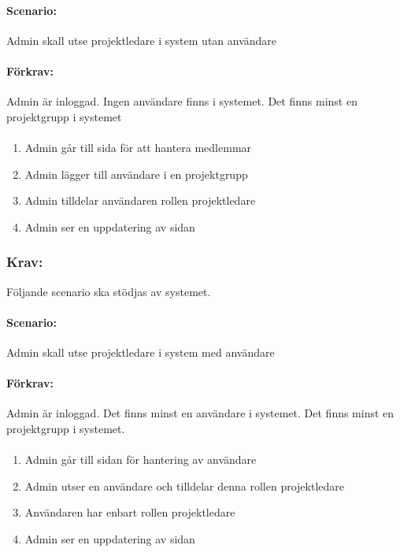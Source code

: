 \documentclass[paper=a4, fontsize=11pt,twoside]{article}
\begin{document}
\paragraph{Scenario:}
Admin skall utse projektledare i system utan användare
\paragraph{Förkrav:}
Admin är inloggad. Ingen användare finns i systemet. Det finns minst en projektgrupp i systemet
\paragraph{}
\begin{enumerate}
\item Admin går till sida för att hantera medlemmar
\item Admin lägger till användare i en projektgrupp
\item Admin tilldelar användaren rollen projektledare
\item Admin ser en uppdatering av sidan
\end{enumerate}

\subsubsection*{Krav:} Följande scenario ska stödjas av systemet. 
\paragraph{Scenario:}
Admin skall utse projektledare i system med användare
\paragraph{Förkrav:}
Admin är inloggad. Det finns minst en användare i systemet. Det finns minst en projektgrupp i systemet.
\paragraph{}
\begin{enumerate}
\item Admin går till sidan för hantering av användare
\item Admin utser en användare och tilldelar denna rollen projektledare
\item Användaren har enbart rollen projektledare
\item Admin ser en uppdatering av sidan
\end{enumerate}
\end{document}
